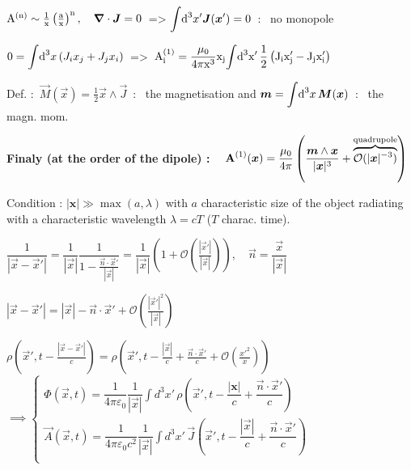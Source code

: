 \item $\rm{A}^{(n)} \sim \frac{1}{x} \left( \frac{a}{x} \right)^n, \quad \vec{\nabla}\cdot\vec{J} = 0 \, $ => $ \displaystyle{\int} \ud ^3x' \vec{J}(\vec{x}') = 0 \,$ : \, no monopole

\item $0 = \displaystyle{\int} \ud ^3x \, (J_i x_j + J_j x_i) \,$ => $\, \rm{A}^{(1)}_i = \dfrac{\mu_0}{4\pi x^3} x_j \displaystyle{\int} \ud ^3x' \, \frac{1}{2}\left(J_ix'_j - J_j x'_i \right)$

\item  Def. : $\, \vec{M}(\vec{x}) = \frac{1}{2} \vec{x}\wedge\vec{J} \,$ : \, the magnetisation and  $\vec{m} = \displaystyle{\int} \ud ^3x \, \vec{M}(\vec{x}) \, $ : \, the magn. mom.

\item \textbf{Finaly (at the order of the dipole) :} $\quad  \vec{\rm{A}}^{(1)}(\vec{x}) =  \dfrac{\mu_0}{4\pi}\left(\dfrac{\vec{m}\wedge\vec{x}}{|\vec{x}|^3} + \overbrace{\mathcal{O}(|\vec{x}|^{-3})}^\text{quadrupole}\right)$\\ 
\squishend
{}

Condition : $|\textbf{x}| \gg \max(a, \lambda)$ with $a$ characteristic size of the object radiating with a characteristic wavelength $\lambda = cT$ ($T$ charac. time).
\squishlist
\item $\dfrac{1}{|\vec{x}-\vec{x}'|} = \dfrac{1}{|\vec{x}|}\dfrac{1}{1- \frac{\vec{n} \cdot \vec{x}'}{|\vec{x}|}} = \dfrac{1}{|\vec{x}|}\left(1+\mathcal{O}(\frac{|\vec{x}'|}{|\vec{x}|})\right), \quad \vec{n} = \dfrac{\vec{x}}{|\vec{x}|}$

\item $|\vec{x}-\vec{x}'| = |\vec{x}| - \vec{n} \cdot \vec{x}' + \mathcal{O}(\frac{|\vec{x}'|^2}{|\vec{x}|})$

\item $\rho(\vec{x}', t - \frac{|\vec{x} - \vec{x}'|}{c}) = \rho (\vec{x}', t-\frac{|\vec{x}|}{c} + \frac{\vec{n}\cdot\vec{x}'}{c} + \mathcal{O}(\frac{x'^2}{x}))$
\\
$      \implies
\begin{cases}
\Phi(\vec{x},t) = \dfrac{1}{4\pi\varepsilon_0}\dfrac{1}{|\vec{x}|}\displaystyle{\int} d^3x' \, \rho(\vec{x}',t- \dfrac{|\textbf{x}|}{c} + \dfrac{\vec{n} \cdot \vec{x}'}{c}) \\
\vec{A}(\vec{x},t) = \dfrac{1}{4\pi\varepsilon_0c^2} \dfrac{1}{|\vec{x}|} \displaystyle{\int} d^3x' \, \vec{J}(\vec{x}',t- \dfrac{|\vec{x}|}{c} + \dfrac{\vec{n} \cdot \vec{x}'}{c}) \\
\end{cases}$

